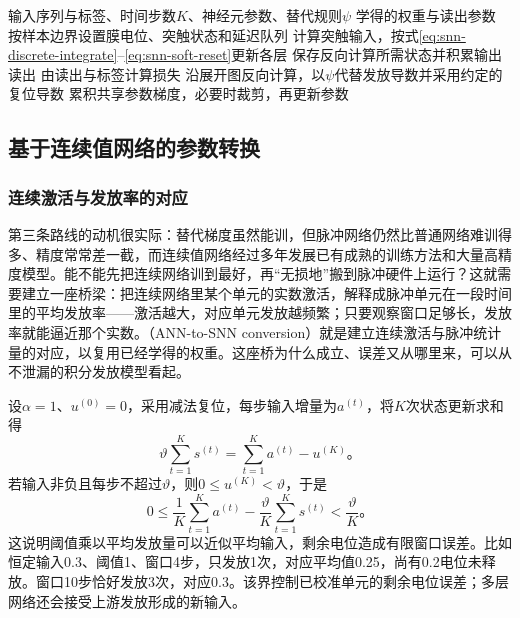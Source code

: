 \begin{algorithm}[脉冲网络的监督训练]
  \label{alg:snn-supervised}
  \begin{algorithmic}[1]
    \Require 输入序列与标签、时间步数$K$、神经元参数、替代规则$\psi$
    \Ensure 学得的权重与读出参数
      \State 按样本边界设置膜电位、突触状态和延迟队列
        \State 计算突触输入，按式\eqref{eq:snn-discrete-integrate}--\eqref{eq:snn-soft-reset}更新各层
        \State 保存反向计算所需状态并积累输出读出
      \EndFor
      \State 由读出与标签计算损失
      \State 沿展开图反向计算，以$\psi$代替发放导数并采用约定的复位导数
      \State 累积共享参数梯度，必要时裁剪，再更新参数
    \EndFor
  \end{algorithmic}
\end{algorithm}

\subsection{基于连续值网络的参数转换}
\label{sec:snn-conversion}

\subsubsection{连续激活与发放率的对应}
\label{sec:snn-rate-conversion}

第三条路线的动机很实际：替代梯度虽然能训，但脉冲网络仍然比普通网络难训得多、精度常常差一截，而连续值网络经过多年发展已有成熟的训练方法和大量高精度模型。能不能先把连续网络训到最好，再“无损地”搬到脉冲硬件上运行？这就需要建立一座桥梁：把连续网络里某个单元的实数激活，解释成脉冲单元在一段时间里的平均发放率——激活越大，对应单元发放越频繁；只要观察窗口足够长，发放率就能逼近那个实数。（ANN-to-SNN conversion）就是建立连续激活与脉冲统计量的对应，以复用已经学得的权重。这座桥为什么成立、误差又从哪里来，可以从不泄漏的积分发放模型看起。

设$\alpha=1$、$u^{(0)}=0$，采用减法复位，每步输入增量为$a^{(t)}$，将$K$次状态更新求和得
\begin{equation}
  \vartheta\sum_{t=1}^{K}s^{(t)}
  =\sum_{t=1}^{K}a^{(t)}-u^{(K)}\text{。}
  \label{eq:snn-conversion-balance}
\end{equation}
若输入非负且每步不超过$\vartheta$，则$0\leq u^{(K)}<\vartheta$，于是
\begin{equation}
  0\leq\frac1K\sum_{t=1}^{K}a^{(t)}
       -\frac{\vartheta}{K}\sum_{t=1}^{K}s^{(t)}
  <\frac{\vartheta}{K}\text{。}
  \label{eq:snn-conversion-error}
\end{equation}
这说明阈值乘以平均发放量可以近似平均输入，剩余电位造成有限窗口误差。比如恒定输入0.3、阈值1、窗口4步，只发放1次，对应平均值0.25，尚有0.2电位未释放。窗口10步恰好发放3次，对应0.3。该界控制已校准单元的剩余电位误差；多层网络还会接受上游发放形成的新输入。

